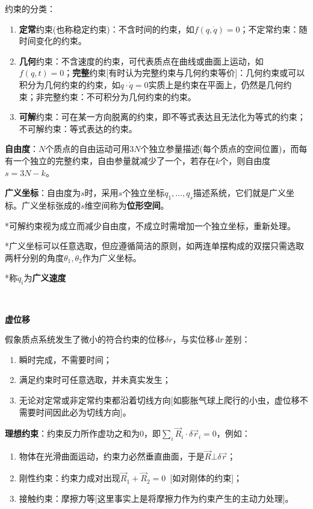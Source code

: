 \documentclass[a4paper,UTF8,fontset=windows]{ctexart}
\newcommand*{\dr}{\hspace{0.07em}\mathrm{d}}
\begin{document}
约束的分类：
\begin{enumerate}
    \item \textbf{定常}约束(也称稳定约束)：不含时间的约束，如$f(q,\dot{q})=0$；不定常约束：随时间变化的约束。
    \item \textbf{几何}约束：不含速度的约束，可代表质点在曲线或曲面上运动，如$f(q,t)=0$；\textbf{完整}约束[有时认为完整约束与几何约束等价]：几何约束或可以积分为几何约束的约束，如$q\cdot\dot{q}=0$实质上是约束在平面上，仍然是几何约束；非完整约束：不可积分为几何约束的约束。
    \item \textbf{可解}约束：可在某一方向脱离的约束，即不等式表达且无法化为等式的约束；不可解约束：等式表达的约束。
\end{enumerate}

\textbf{自由度}：$N$个质点的自由运动可用$3N$个独立参量描述(每个质点的空间位置)，而每有一个独立的完整约束，自由参量就减少了一个，若存在$k$个，则自由度$s=3N-k$。

\textbf{广义坐标}：自由度为$s$时，采用$s$个独立坐标$q_1,\dots,q_s$描述系统，它们就是广义坐标。广义坐标张成的$s$维空间称为\textbf{位形空间}。

*可解约束视为成立而减少自由度，不成立时需增加一个独立坐标，重新处理。

*广义坐标可以任意选取，但应遵循简洁的原则，如两连单摆构成的双摆只需选取两杆分别的角度$\theta_1,\theta_2$作为广义坐标。

*称$\dot{q}_i$为\textbf{广义速度}

\

\textbf{虚位移}

假象质点系统发生了微小的符合约束的位移$\delta r$，与实位移$\dr r$差别：
\begin{enumerate}
    \item 瞬时完成，不需要时间；
    \item 满足约束时可任意选取，并未真实发生；
    \item 无论对定常或非定常约束都沿着切线方向[如膨胀气球上爬行的小虫，虚位移不需要时间因此必为切线方向]。
\end{enumerate}

\textbf{理想约束}：约束反力所作虚功之和为0，即$\sum_i\vec{R}_i\cdot\delta\vec{r}_i=0$，例如：
\begin{enumerate}
    \item 物体在光滑曲面运动，约束力必然垂直曲面，于是$\vec{R}\bot\delta\vec{r}$；
    \item 刚性约束：约束力成对出现$\vec{R}_1+\vec{R}_2=0$\ [如对刚体的约束]；
    \item 接触约束：摩擦力等[这里事实上是将摩擦力作为约束产生的主动力处理]。
\end{enumerate}
\end{document}
